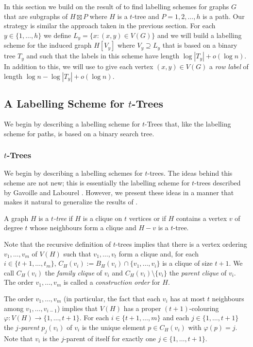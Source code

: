 \documentclass[kpfonts]{patmorin}
\begin{document}
In this section we build on the result of  to find labelling schemes for graphs $G$ that are subgraphs of $H\boxtimes P$ where $H$ is a $t$-tree and $P=1,2,\ldots,h$ is a path.  Our strategy is similar the approach taken in the previous section.
For each $y\in\{1,\ldots,h\}$ we define $L_y=\{x: (x,y)\in V(G)\}$ and we will build a labelling scheme for the induced graph $H[V_y]$ where $V_y\supseteq L_y$ that is based on a binary tree $T_y$ and such that the labels in this scheme have length $\log|T_y|+o(\log n)$.  In addition to this, we will use  to give each vertex $(x,y)\in V(G)$ a \emph{row label} of length $\log n - \log|T_y|+o(\log n)$.

\subsection{A Labelling Scheme for $t$-Trees}

We begin by describing a labelling scheme for $t$-Trees that, like the labelling scheme for paths, is based on a binary search tree.

\subsubsection{$t$-Trees}

We begin by describing a labelling schemes for $t$-trees. The ideas behind this scheme are not new; this is essentially the labelling scheme for $t$-trees described by Gavoille and Labourel \cite{gavoille.labourel:shorter}.  However, we present these ideas in a manner that makes it natural to generalize the results of .

A graph $H$ is a \emph{$t$-tree} if $H$ is a clique on $t$ vertices or if $H$ contains a vertex $v$ of degree $t$ whose neighbours form a clique and $H-v$ is a $t$-tree.  

Note that the recursive definition of $t$-trees implies that there is a vertex ordering $v_1,\ldots,v_{m}$ of $V(H)$ such that $v_1,\ldots,v_t$ form a clique and, for each $i\in\{t+1,\ldots,t_m\}$, $C_H(v_i):=B_H(v_i)\cap \{v_1,\ldots,v_{i}\}$ is a clique of size $t+1$.  We call $C_H(v_i)$ the \emph{family clique} of $v_i$ and $C_H(v_i)\setminus\{v_i\}$ the \emph{parent clique} of $v_i$.  The order $v_1,\ldots,v_m$ is called a \emph{construction order} for $H$.

The order $v_1,\ldots,v_m$ (in particular, the fact that each $v_i$ has at most $t$ neighbours among $v_1,\ldots,v_{i-1}$) implies that $V(H)$ has a proper $(t+1)$-colouring $\varphi:V(H)\to\{1,\ldots,t+1\}$.  For each $i\in\{t+1,\ldots,m\}$ and each $j\in\{1,\ldots,t+1\}$ the \emph{$j$-parent} $p_j(v_i)$ of $v_i$ is the unique element $p\in C_H(v_i)$ with $\varphi(p)=j$.  Note that $v_i$ is the $j$-parent of itself for exactly one $j\in\{1,\ldots,t+1\}$.
\end{document}
